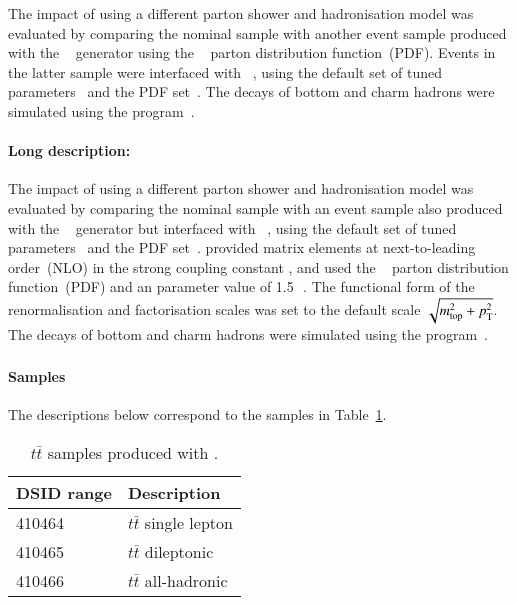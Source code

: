 The impact of using a different parton shower and hadronisation model was evaluated
by comparing the nominal \ttbar sample with another event sample produced with the
\POWHEGBOX[v2]~\cite{Frixione:2007nw,Nason:2004rx,Frixione:2007vw,Alioli:2010xd}
generator using the \NNPDF[3.0nlo]~\cite{Ball:2014uwa} parton distribution function~(PDF). 
Events in the latter sample were interfaced with \HERWIG[7.13]~\cite{Bahr:2008pv,Bellm:2015jjp}, 
using the \HERWIG[7.1] default set of tuned parameters~\cite{Bellm:2015jjp,Bellm:2017jjp} 
and the \MMHT[lo] PDF set~\cite{Harland-Lang:2014zoa}.
The decays of bottom and charm hadrons
were simulated using the \EVTGEN[1.6.0] program~\cite{Lange:2001uf}. 

\paragraph{Long description:}

The impact of using a different parton shower and hadronisation model was evaluated
by comparing the nominal \ttbar sample with an event sample also produced with the
\POWHEGBOX[v2]~\cite{Frixione:2007nw,Nason:2004rx,Frixione:2007vw,Alioli:2010xd}
generator but interfaced with \HERWIG[7.13]~\cite{Bahr:2008pv,Bellm:2015jjp}, using the 
\HERWIG[7.1] default set of tuned parameters~\cite{Bellm:2015jjp,Bellm:2017jjp} and the 
\MMHT[lo] PDF set~\cite{Harland-Lang:2014zoa}. 
\POWHEGBOX provided matrix elements at next-to-leading
order~(NLO) in the strong coupling constant \alphas, and used the
\NNPDF[3.0nlo]~\cite{Ball:2014uwa} parton distribution function~(PDF) and
an \hdamp parameter value of 1.5\,\mtop~\cite{ATL-PHYS-PUB-2016-020}.
The functional form of the renormalisation and factorisation scales was
set to the default scale $\sqrt{m_{\textrm{top}}^2 + p_{\textrm T}^2}$.  
The decays of bottom and charm hadrons
were simulated using the \EVTGEN[1.6.0] program~\cite{Lange:2001uf}. 


\subsubsection[MadGraph5\_aMC@NLO+Pythia8]{\MGNLOPY[8]}
\label{subsubsec:ttbar_aMCP8}

\paragraph{Samples}

The descriptions below correspond to the samples in Table~\ref{tab:ttbar_aMCP8}.
\begin{table}[htbp]
\begin{center}
\caption{$t\bar{t}$ samples produced with \MGNLOPY[8].}
\label{tab:ttbar_aMCP8}
\begin{tabular}{ l | l }
\hline
DSID range & Description \\
\hline
410464 & $t\bar{t}$ single lepton \\
410465 & $t\bar{t}$ dileptonic \\
410466 & $t\bar{t}$ all-hadronic \\
\hline
\end{tabular}
\end{center}
\end{table}


